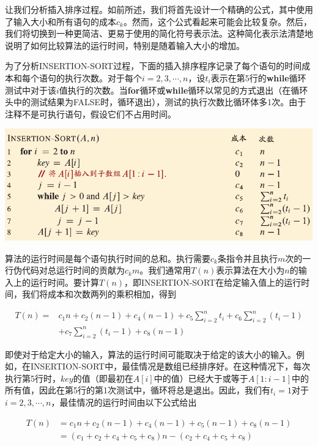\documentclass[lang=cn,newtx,10pt,scheme=chinese]{elegantbook}
\begin{document}
让我们分析插入排序过程。如前所述，我们将首先设计一个精确的公式，其中使用了输入大小和所有语句的成本$c_k$。然而，这个公式看起来可能会比较复杂。然后，我们将切换到一种更简洁、更易于使用的简化符号表示法。这种简化表示法清楚地说明了如何比较算法的运行时间，特别是随着输入大小的增加。

为了分析INSERTION-SORT过程，下面的插入排序程序记录了每个语句的时间成本和每个语句的执行次数。对于每个$i=2,3,\cdots,n$，设$t_i$表示在第5行的\textbf{while}循环测试中对于该$i$值执行的次数。当\textbf{for}循环或\textbf{while}循环以常见的方式退出（在循环头中的测试结果为FALSE时，循环退出），测试的执行次数比循环体多1次。由于注释不是可执行语句，假设它们不占用时间。

\includegraphics{算法导论第四版插图/第二章/插入排序时间复杂度的代码.pdf}

算法的运行时间是每个语句执行时间的总和。执行需要$c_k$条指令并且执行$m$次的一行伪代码对总运行时间的贡献为$c_km$。我们通常用$T(n)$表示算法在大小为$n$的输入上的运行时间。要计算$T(n)$，即INSERTION-SORT在给定输入值上的运行时间，我们将成本和次数两列的乘积相加，得到

\begin{equation*}
\begin{aligned}
T(n)= & c_1 n+c_2(n-1)+c_4(n-1)+c_5 \sum_{i=2}^n t_i+c_6 \sum_{i=2}^n(t_i-1) \\
& +c_7 \sum_{i=2}^n(t_i-1)+c_8(n-1)
\end{aligned}
\end{equation*}

即使对于给定大小的输入，算法的运行时间可能取决于给定的该大小的输入。例如，在INSERTION-SORT中，最佳情况是数组已经排序好。在这种情况下，每次执行第5行时，$key$的值（即最初在$A[i]$中的值）已经大于或等于$A[1:i-1]$中的所有值，因此在第5行的第1次测试中，循环将总是退出。因此，我们有$t_i=1$对于$i=2,3,\cdots,n$，最佳情况的运行时间由以下公式给出

\begin{equation}\label{eq:2.1}
\begin{aligned}
T(n) & =c_1 n+c_2(n-1)+c_4(n-1)+c_5(n-1)+c_8(n-1) \\
& =(c_1+c_2+c_4+c_5+c_8)n-(c_2+c_4+c_5+c_8)
\end{aligned}
\end{equation}
\end{document}
